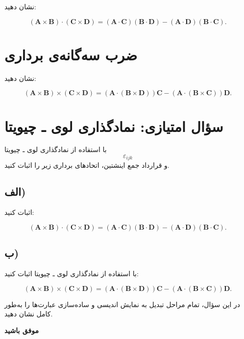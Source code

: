 \documentclass[a4paper,16pt]{article}
\begin{document}
نشان دهید:

\[
\boxed{
(\mathbf{A}\times\mathbf{B})
\cdot
(\mathbf{C}\times\mathbf{D})
=
(\mathbf{A}\cdot\mathbf{C})
(\mathbf{B}\cdot\mathbf{D})
-
(\mathbf{A}\cdot\mathbf{D})
(\mathbf{B}\cdot\mathbf{C})
}.
\]



\section{ضرب سه‌گانه‌ی برداری}

نشان دهید:

\[
\boxed{
(\mathbf{A}\times\mathbf{B})
\times
(\mathbf{C}\times\mathbf{D})
=
(\mathbf{A}\cdot(\mathbf{B}\times\mathbf{D}))\mathbf{C}
-
(\mathbf{A}\cdot(\mathbf{B}\times\mathbf{C}))\mathbf{D}
}.
\]



\section{سؤال امتیازی: نمادگذاری لوی ـ چیویتا}

با استفاده از نمادگذاری لوی ـ چیویتا
\[
\varepsilon_{ijk}
\]
و قرارداد جمع اینشتین، اتحادهای برداری زیر را اثبات کنید.

\subsection*{الف)}

اثبات کنید:

\[
\boxed{
(\mathbf{A}\times\mathbf{B})
\cdot
(\mathbf{C}\times\mathbf{D})
=
(\mathbf{A}\cdot\mathbf{C})
(\mathbf{B}\cdot\mathbf{D})
-
(\mathbf{A}\cdot\mathbf{D})
(\mathbf{B}\cdot\mathbf{C})
}.
\]

\subsection*{ب)}

با استفاده از نمادگذاری لوی ـ چیویتا اثبات کنید:

\[
\boxed{
(\mathbf{A}\times\mathbf{B})
\times
(\mathbf{C}\times\mathbf{D})
=
(\mathbf{A}\cdot(\mathbf{B}\times\mathbf{D}))\mathbf{C}
-
(\mathbf{A}\cdot(\mathbf{B}\times\mathbf{C}))\mathbf{D}
}.
\]

در این سؤال، تمام مراحل تبدیل به نمایش اندیسی و ساده‌سازی عبارت‌ها را به‌طور کامل نشان دهید.


\vspace{20pt}

\begin{center}
	\textbf{\Large موفق باشید}
\end{center}
\end{document}
